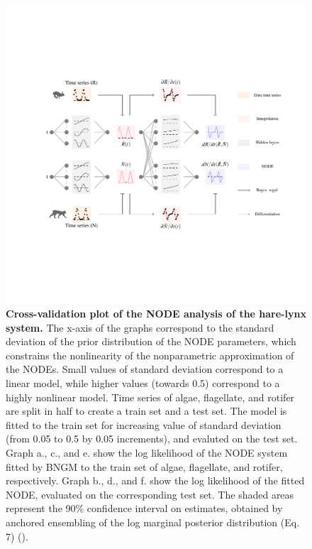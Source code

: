 \documentclass[11pt, oneside]{article}
\begin{document}
\newpage
\begin{figure}[H]
\includegraphics[width=1\linewidth,page=17]{figures/main.pdf}
\caption{
    \textbf{Cross-validation plot of the NODE analysis of the hare-lynx system.}
    The x-axis of the graphs correspond to the standard deviation of the prior distribution of the NODE parameters, which constrains the nonlinearity of the nonparametric approximation of the NODEs.
    Small values of standard deviation correspond to a linear model, while higher values (towards 0.5) correspond to a highly nonlinear model.
    Time series of algae, flagellate, and rotifer are split in half to create a train set and a test set. 
    The model is fitted to the train set for increasing value of standard deviation (from 0.05 to 0.5 by 0.05 increments), and evaluted on the test set.
    Graph a., c., and e. show the log likelihood of the NODE system fitted by BNGM to the train set of algae, flagellate, and rotifer, respectively.
    Graph b., d., and f. show the log likelihood of the fitted NODE, evaluated on the corresponding test set.
    The shaded areas represent the 90\% confidence interval on estimates, obtained by anchored ensembling of the log marginal posterior distribution (Eq. 7) (\cite{Pearce2018}).
}
\end{figure}
\newpage
\end{document}
